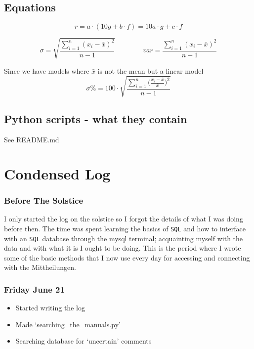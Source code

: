 \documentclass[12pt]{article}
\begin{document}
\subsection{Equations}

\begin{equation}\label{derivde equation}
    r = a\cdot(10 g + b\cdot f) = 10 a\cdot g + c\cdot f
\end{equation}

\begin{equation}\label{standard deviation equation}
    \sigma = \sqrt{\frac{\sum_{i=1}^{n} (x_i - \bar{x})^2}{n-1}}  \quad \quad \quad \quad 
    var = \frac{\sum_{i=1}^{n} (x_i - \bar{x})^2}{n-1}
\end{equation}

Since we have models where $\bar{x}$ is not the mean but a linear model
\begin{equation}\label{standard deviation percentage equation}
    \sigma\% = 100\cdot \sqrt{\frac{\sum_{i=1}^{n}\big(\frac{x_i-\bar{x}}{\bar{x}}\big)^2}{n-1}}
\end{equation}


\subsection{Python scripts - what they contain}

See README.md


\section{Condensed Log}

\subsubsection{Before The Solstice}
I only started the log on the solstice so I forgot the details of what I was doing before then. The time was spent learning the basics of \texttt{SQL} and how to interface with an \texttt{SQL} database through the mysql terminal; acquainting myself with the data and with what it is I ought to be doing. This is the period where I wrote some of the basic methods that I now use every day for accessing and connecting with the Mittheilungen.

\subsubsection{Friday June 21}
\begin{itemize}
    \item Started writing the log
    \item Made `searching\_the\_manuals.py'
    \item Searching database for `uncertain' comments
\end{itemize}
    
\end{document}

